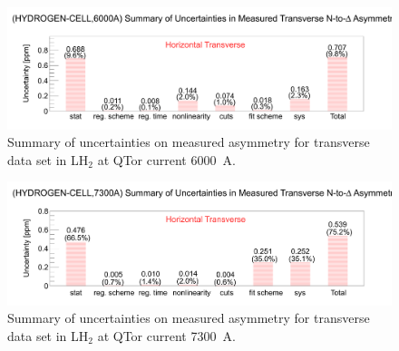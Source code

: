 \begin{figure}[!h]
	\begin{center}
	\includegraphics[width=15.0cm]{figures/errorChartLH2_6000A}
	\end{center}
	\caption
	{Summary of uncertainties on measured asymmetry for transverse data set in LH$_{2}$ at QTor current 6000~A.}
	\label{fig:errorChartLH2_6000A}
\end{figure}

\begin{figure}[!h]
	\begin{center}
	\includegraphics[width=15.0cm]{figures/errorChartLH2_7300A}
	\end{center}
	\caption
	{Summary of uncertainties on measured asymmetry for transverse data set in LH$_{2}$ at QTor current 7300~A.}
	\label{fig:errorChartLH2_7300A}
\end{figure}


